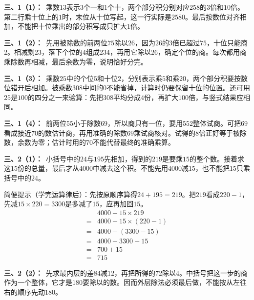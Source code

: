 \documentclass[multi=snippet,border=0pt]{standalone}
\newenvironment{snippet}[3]{\begin{minipage}{#1bp}\color{answerred}\fontsize{#2}{#3}\selectfont\raggedright}{\end{minipage}}
\begin{document}
\begin{snippet}{505}{11.5}{14}\textbf{三、1（1）：}\ 乘数\(13\)表示\(3\)个一和\(1\)个十，两个部分积分别对应\(258\)的\(3\)倍和\(10\)倍。第二行乘十位上的\(1\)时，末位从十位写起，这一行实际是\(2580\)。最后按数位对齐相加，不能把十位乘出的部分积写成只扩大\(1\)倍。\end{snippet}
\begin{snippet}{505}{11.5}{14}\textbf{三、1（2）：}\ 先用被除数的前两位\(75\)除以\(26\)，因为\(26\)的\(3\)倍已超过\(75\)，十位只能商\(2\)。相减剩\(23\)，落下个位的\(4\)组成\(234\)，再用它除以\(26\)，确定个位的商。每次都用商乘除数再相减，最后余数为零，说明恰好分完。\end{snippet}
\begin{snippet}{505}{11.5}{14}\textbf{三、1（3）：}\ 乘数\(25\)中的个位\(5\)和十位\(2\)，分别表示乘\(5\)和乘\(20\)，两个部分积要按数位错开后相加。被乘数\(308\)中间的\(0\)不能省掉，计算时仍要保留十位的位置。还可用\(25\)是\(100\)的四分之一来验算：先把\(308\)平均分成\(4\)份，再扩大\(100\)倍，与竖式结果应相同。\end{snippet}
\begin{snippet}{505}{11.5}{14}\textbf{三、1（4）：}\ 前两位\(55\)小于除数\(69\)，所以商只有一位，要用\(552\)整体试商。可把\(69\)看成接近\(70\)的数估计商，再用准确的除数\(69\)乘试商核对。试得的\(8\)倍正好等于被除数，余数为零；估计时用的\(70\)不能代替最终的准确乘算。\end{snippet}
\begin{snippet}{505}{11.5}{14}\textbf{三、2（1）：}\ 小括号中的\(24\)与\(195\)先相加，得到的\(219\)是要乘\(15\)的整个数。接着求这\(15\)份的总量，最后才从\(4000\)中减去这个积。不能先用\(4000\)减\(15\)，也不能把\(15\)只乘括号中的\(24\)。\par 简便提示（学完运算律后）：先按原顺序算得\(24+195=219\)。把\(219\)看成\(220-1\)，先减\(15\times220=3300\)是多减了\(15\)，应再加回\(15\)。\[\begin{aligned}&4000-15\times219\\={}&4000-15\times(220-1)\\={}&4000-(3300-15)\\={}&4000-3300+15\\={}&700+15\\={}&715\end{aligned}\]\end{snippet}
\begin{snippet}{505}{11.5}{14}\textbf{三、2（2）：}\ 先求最内层的差\(84\)减\(12\)，再把所得的\(72\)除以\(4\)。中括号把这一步的商作为一个整体，它才是\(180\)要除以的数。因而外层除法必须最后做，不能按从左往右的顺序先动\(180\)。\end{snippet}
\end{document}
